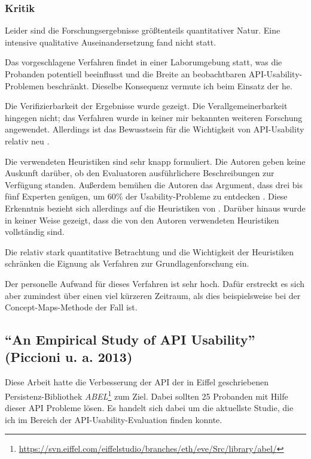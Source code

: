 \subsubsection{Kritik}
\label{sec:grill-kritik}

\begin{important}
Leider sind die Forschungsergebnisse größtenteils quantitativer Natur. Eine intensive qualitative Auseinandersetzung fand nicht statt.

Das vorgeschlagene Verfahren findet in einer Laborumgebung statt, was die Probanden potentiell beeinflusst und die Breite an beobachtbaren API-Usability-Problemen beschränkt. Dieselbe Konsequenz vermute ich beim Einsatz der \gls{he}.

Die Verifizierbarkeit der Ergebnisse wurde gezeigt. Die Verallgemeinerbarkeit hingegen nicht; das Verfahren wurde in keiner mir bekannten weiteren Forschung angewendet. Allerdings ist das Bewusstsein für die Wichtigkeit von API-Usability relativ neu \citep{Robillard:2010bh}.

Die verwendeten Heuristiken sind sehr knapp formuliert. Die Autoren geben keine Auskunft darüber, ob den Evaluatoren ausführlichere Beschreibungen zur Verfügung standen. Außerdem bemühen die Autoren das Argument, dass drei bis fünf Experten genügen, um 60\% der Usability-Probleme zu entdecken \citep{UmerFarooq:2010tt}. Diese Erkenntnis bezieht sich allerdings auf die Heuristiken von \cite{Nielsen:1993vk}. Darüber hinaus wurde in keiner Weise gezeigt, dass die von den Autoren verwendeten Heuristiken vollständig sind.

Die relativ stark quantitative Betrachtung und die Wichtigkeit der Heuristiken schränken die Eignung als Verfahren zur Grundlagenforschung ein.
 
Der personelle Aufwand für dieses Verfahren ist sehr hoch. Dafür erstreckt es sich aber zumindest über einen viel kürzeren Zeitraum, als dies beispielsweise bei der Concept-Maps-Methode \citep{Tenny:2011jp} der Fall ist.
\end{important}






\subsection{``An Empirical Study of API Usability'' (Piccioni u. a. 2013)}
\label{sec:piccioni}

Diese Arbeit hatte die Verbesserung der API der in Eiffel geschriebenen Persistenz-Bibliothek \textit{ABEL}\footnote{\url{https://svn.eiffel.com/eiffelstudio/branches/eth/eve/Src/library/abel/}} zum Ziel. Dabei sollten 25 Probanden mit Hilfe dieser API Probleme lösen. Es handelt sich dabei um die aktuellste Studie, die ich im Bereich der API-Usability-Evaluation finden konnte.


